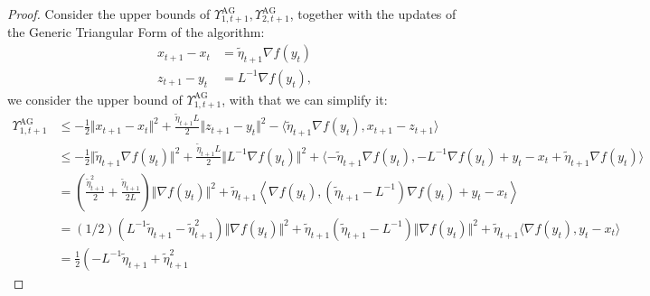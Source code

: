 \documentclass[12pt]{article}
\begin{document}
        \begin{proof}
            Consider the upper bounds of $\Upsilon_{1, t + 1}^\text{AG}, \Upsilon_{2, t + 1}^\text{AG}$, together with the updates of the Generic Triangular Form of the algorithm:  
            \begin{align*}
                x_{t + 1} - x_t &= \tilde \eta_{t + 1}\nabla f(y_t)
                \\
                z_{t +1} - y_t &= L^{-1}\nabla f(y_t), 
            \end{align*}
            we consider the upper bound of $\Upsilon_{1, t + 1}^{\text{AG}}$, with that we can simplify it: 
            {\footnotesize
            \begin{align*}
                \Upsilon_{1, t + 1}^{\text{AG}}
                &\le 
                -\frac{1}{2}\Vert x_{t + 1} - x_t\Vert^2 
                + 
                \frac{\tilde \eta_{t + 1}L }{2} \Vert z_{t + 1} - y_t\Vert^2 
                - 
                \langle \tilde \eta_{t + 1} \nabla f(y_t), x_{t +1} - z_{t + 1}\rangle
                \\
                &\le 
                - \frac{1}{2}\Vert \tilde \eta_{t + 1} \nabla f(y_t)\Vert^2 
                + \frac{\tilde \eta_{t + 1} L}{2}\Vert L^{-1} \nabla f(y_t)\Vert^2 
                + 
                \langle 
                    - \tilde \eta_{t + 1} \nabla f(y_t), 
                    -L^{-1}\nabla f(y_t) + y_t - x_t + \tilde \eta_{t + 1}\nabla f(y_t)
                \rangle
                \\
                &= 
                \left(
                    \frac{\tilde \eta_{t + 1}^2}{2} + 
                    \frac{\tilde \eta_{t + 1}}{2L}
                \right)
                \Vert \nabla f(y_t)\Vert^2 
                + \tilde \eta_{t + 1} 
                \left\langle 
                    \nabla f(y_t), 
                    (\tilde \eta_{t + 1} - L^{-1})\nabla f(y_t) + y_t - x_t 
                \right\rangle
                \\
                &= 
                (1/2)(L^{-1}\tilde \eta_{t + 1} - \tilde \eta_{t + 1}^2)
                \Vert \nabla f(y_t)\Vert^2
                + 
                \tilde \eta_{t + 1}(\tilde \eta_{t + 1} - L^{-1})
                \Vert \nabla f(y_t)\Vert^2
                + 
                \tilde \eta_{t + 1}\langle \nabla f(y_t), y_t - x_t\rangle
                \\
                &= \frac{1}{2}\left(
                    -L^{-1}\tilde \eta_{t + 1} + \tilde \eta_{t + 1}^2

\end{align*}}
\end{proof}
\end{document}
